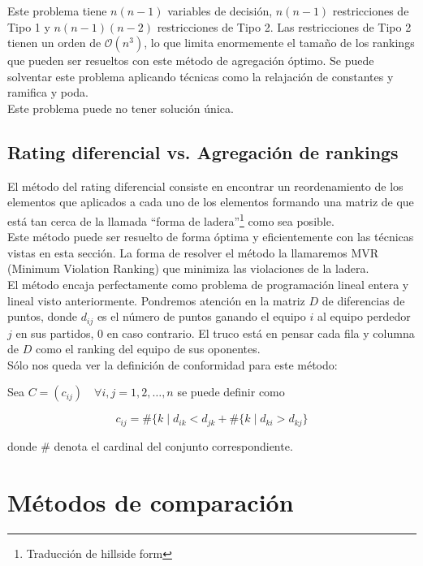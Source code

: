  Este problema tiene $n(n-1)$ variables de decisión, $n(n-1)$ restricciones de Tipo 1 y $n(n-1)(n-2)$ restricciones de Tipo 2. Las restricciones de Tipo 2 tienen un orden de $\mathcal{O}(n^3)$, lo que limita enormemente el tamaño de los rankings que pueden ser resueltos con este método de agregación óptimo. Se puede solventar este problema aplicando técnicas como la relajación de constantes y ramifica y poda.\\
 
 Este problema puede no tener solución única.\\
 
 \subsection{Rating diferencial vs. Agregación de rankings}
 
 El método del rating diferencial consiste en encontrar un reordenamiento de los elementos que aplicados a cada uno de los elementos formando una matriz de que está tan cerca de la llamada ``forma de ladera''\footnote{Traducción de hillside form} como sea posible.\\
 
 Este método puede ser resuelto de forma óptima y eficientemente con las técnicas vistas en esta sección. La forma de resolver el método la llamaremos MVR (Minimum Violation Ranking) que minimiza las violaciones de la ladera.\\
 
 El método encaja perfectamente como problema de programación lineal entera y lineal visto anteriormente. Pondremos atención en la matriz $D$ de diferencias de puntos, donde $d_{ij}$ es el número de puntos ganando el equipo $i$ al equipo perdedor $j$ en sus partidos, $0$ en caso contrario. El truco está en pensar cada fila y columna de $D$ como el ranking del equipo de sus oponentes.\\
 
 Sólo nos queda ver la definición de conformidad para este método:
 
 \begin{defi}
 Sea $C = (c_{ij}) \quad \forall i,j = 1,2,\dots,n$ se puede definir como
 
 \[ c_{ij} = \#\{ k \mid d_{ik} < d_{jk} + \#\{ k \mid d_{ki} > d_{kj} \} \]
 
 donde $\#$ denota el cardinal del conjunto correspondiente.
 \end{defi}
 
 \section{Métodos de comparación}
 
